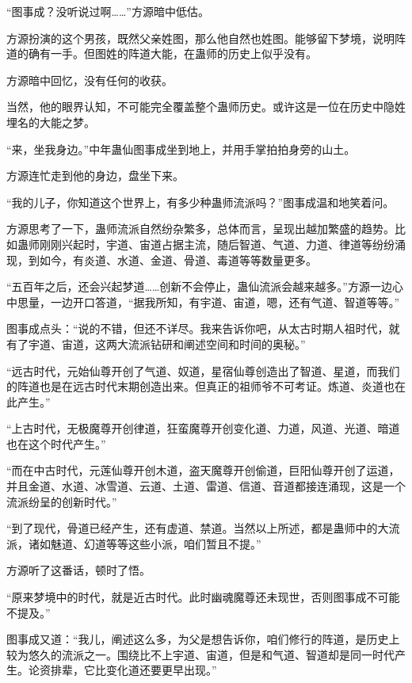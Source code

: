 
\begin{this_body}



“图事成？没听说过啊……”方源暗中低估。

方源扮演的这个男孩，既然父亲姓图，那么他自然也姓图。能够留下梦境，说明阵道的确有一手。但图姓的阵道大能，在蛊师的历史上似乎没有。

方源暗中回忆，没有任何的收获。

当然，他的眼界认知，不可能完全覆盖整个蛊师历史。或许这是一位在历史中隐姓埋名的大能之梦。

“来，坐我身边。”中年蛊仙图事成坐到地上，并用手掌拍拍身旁的山土。

方源连忙走到他的身边，盘坐下来。

“我的儿子，你知道这个世界上，有多少种蛊师流派吗？”图事成温和地笑着问。

方源思考了一下，蛊师流派自然纷杂繁多，总体而言，呈现出越加繁盛的趋势。比如蛊师刚刚兴起时，宇道、宙道占据主流，随后智道、气道、力道、律道等纷纷涌现，到如今，有炎道、水道、金道、骨道、毒道等等数量更多。

“五百年之后，还会兴起梦道……创新不会停止，蛊仙流派会越来越多。”方源一边心中思量，一边开口答道，“据我所知，有宇道、宙道，嗯，还有气道、智道等等。”

图事成点头：“说的不错，但还不详尽。我来告诉你吧，从太古时期人祖时代，就有了宇道、宙道，这两大流派钻研和阐述空间和时间的奥秘。”

“远古时代，元始仙尊开创了气道、奴道，星宿仙尊创造出了智道、星道，而我们的阵道也是在远古时代末期创造出来。但真正的祖师爷不可考证。炼道、炎道也在此产生。”

“上古时代，无极魔尊开创律道，狂蛮魔尊开创变化道、力道，风道、光道、暗道也在这个时代产生。”

“而在中古时代，元莲仙尊开创木道，盗天魔尊开创偷道，巨阳仙尊开创了运道，并且金道、水道、冰雪道、云道、土道、雷道、信道、音道都接连涌现，这是一个流派纷呈的创新时代。”

“到了现代，骨道已经产生，还有虚道、禁道。当然以上所述，都是蛊师中的大流派，诸如魅道、幻道等等这些小派，咱们暂且不提。”

方源听了这番话，顿时了悟。

“原来梦境中的时代，就是近古时代。此时幽魂魔尊还未现世，否则图事成不可能不提及。”

图事成又道：“我儿，阐述这么多，为父是想告诉你，咱们修行的阵道，是历史上较为悠久的流派之一。围绕比不上宇道、宙道，但是和气道、智道却是同一时代产生。论资排辈，它比变化道还要更早出现。”


\end{this_body}
